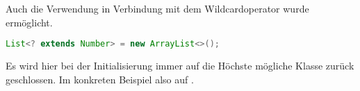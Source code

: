 \documentclass[times, 10pt,twocolumn]{article}
\begin{document}
Auch die Verwendung in Verbindung mit dem Wildcardoperator wurde ermöglicht.
\begin{lstlisting}[language=java,breaklines=true]
  List<? extends Number> = new ArrayList<>();
\end{lstlisting}
Es wird hier bei der Initialisierung immer auf die Höchste mögliche Klasse zurück geschlossen. Im konkreten Beispiel also auf .\cite{v2bJava7}








\end{document}
